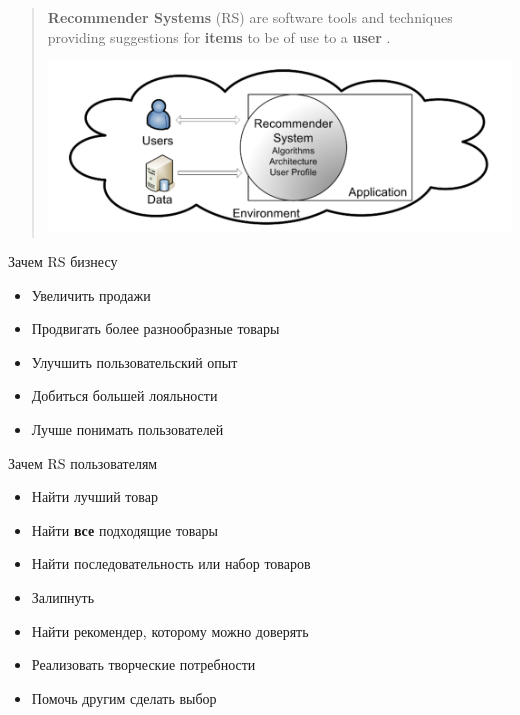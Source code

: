 \documentclass[11pt,aspectratio=169]{beamer}
\begin{document}
\begin{frame}{}

\begin{quote}
\vfill
{\bf Recommender Systems} (RS) are software tools and techniques providing suggestions for {\bf items} to be of use to a {\bf user} \cite{RSHB}.
\vfill
\begin{center}
\includegraphics[scale=0.3]{images/overall.png}
\end{center}
\end{quote}

\end{frame}

\begin{frame}{Зачем RS бизнесу}

\begin{itemize}
\item Увеличить продажи
\item Продвигать более разнообразные товары
\item Улучшить пользовательский опыт
\item Добиться большей лояльности
\item Лучше понимать пользователей
\end{itemize}

\end{frame}

\begin{frame}{Зачем RS пользователям}

\begin{itemize}
\item Найти лучший товар
\item Найти {\bf все} подходящие товары
\item Найти последовательность или набор товаров
\item Залипнуть
\item Найти рекомендер, которому можно доверять
\item Реализовать творческие потребности
\item Помочь другим сделать выбор
\end{itemize}

\end{frame}
\end{document}
